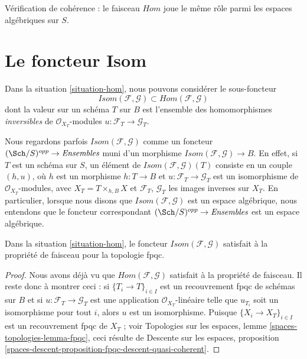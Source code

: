 \noindent
Vérification de cohérence : le faisceau $\mathit{Hom}$ joue le même rôle parmi
les espaces algébriques sur $S$.

\section{Le foncteur Isom}
\label{section-isom}

\noindent
Dans la situation \ref{situation-hom}, nous pouvons considérer le
sous-foncteur
$$
\mathit{Isom}(\mathcal{F}, \mathcal{G}) \subset
\mathit{Hom}(\mathcal{F}, \mathcal{G})
$$
dont la valeur sur un schéma $T$ sur $B$ est l'ensemble des homomorphismes
{\it inversibles} de $\mathcal{O}_{X_T}$-modules
$u : \mathcal{F}_T \to \mathcal{G}_T$.

\medskip\noindent
Nous regardons parfois $\mathit{Isom}(\mathcal{F}, \mathcal{G})$ comme un
foncteur $(\Sch/S)^{opp} \to \textit{Ensembles}$ muni d'un morphisme
$\mathit{Isom}(\mathcal{F}, \mathcal{G}) \to B$. En effet, si $T$ est un
schéma sur $S$, un élément de
$\mathit{Isom}(\mathcal{F}, \mathcal{G})(T)$ consiste en un couple $(h, u)$,
où $h$ est un morphisme $h : T \to B$ et
$u : \mathcal{F}_T \to \mathcal{G}_T$ est un isomorphisme de
$\mathcal{O}_{X_T}$-modules, avec $X_T = T \times_{h, B} X$ et
$\mathcal{F}_T$, $\mathcal{G}_T$ les images inverses sur $X_T$. En
particulier, lorsque nous disons que
$\mathit{Isom}(\mathcal{F}, \mathcal{G})$ est un espace algébrique, nous
entendons que le foncteur correspondant
$(\Sch/S)^{opp} \to \textit{Ensembles}$ est un espace algébrique.

\begin{lemma}
\label{lemma-isom-sheaf}
Dans la situation \ref{situation-hom}, le foncteur
$\mathit{Isom}(\mathcal{F}, \mathcal{G})$
satisfait à la propriété de faisceau pour la topologie fpqc.
\end{lemma}

\begin{proof}
Nous avons déjà vu que $\mathit{Hom}(\mathcal{F}, \mathcal{G})$ satisfait à
la propriété de faisceau. Il reste donc à montrer ceci : si
$\{T_i \to T\}_{i \in I}$ est un recouvrement fpqc de schémas sur $B$ et si
$u : \mathcal{F}_T \to \mathcal{G}_T$ est une application
$\mathcal{O}_{X_T}$-linéaire telle que $u_{T_i}$ soit un isomorphisme pour tout
$i$, alors $u$ est un isomorphisme. Puisque
$\{X_i \to X_T\}_{i \in I}$ est un recouvrement fpqc de $X_T$ ; voir
Topologies sur les espaces, lemme \ref{spaces-topologies-lemma-fpqc}, ceci
résulte de Descente sur les espaces, proposition
\ref{spaces-descent-proposition-fpqc-descent-quasi-coherent}.
\end{proof}


